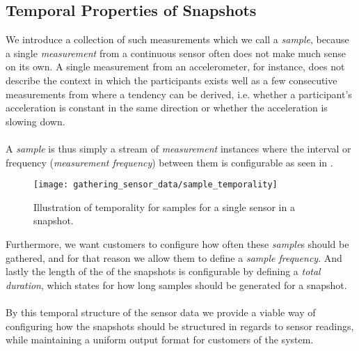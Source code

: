 
\subsection{Temporal Properties of Snapshots}
\label{sec:temporal_properties_of_snapshots}



We introduce a collection of such measurements which we call a \emph{sample}, because a single \emph{measurement} from a continuous sensor often does not make much sense on its own. A single measurement from an accelerometer, for instance, does not describe the context in which the participants exists well as a few consecutive measurements from where a tendency can be derived, i.e. whether a participant's acceleration is constant in the same direction or whether the acceleration is slowing down.
\\\\
A \emph{sample} is thus simply a stream of \emph{measurement} instances where the interval or frequency (\emph{measurement frequency}) between them is configurable as seen in .

\begin{figure}[!htbp]
    \centering
    \texttt{[image: gathering\_sensor\_data/sample\_temporality]}
    \caption{Illustration of temporality for samples for a single sensor in a snapshot.}
    \label{fig:sample_temporality}
\end{figure}
\FloatBarrier

Furthermore, we want customers to configure how often these \emph{sample}s should be gathered, and for that reason we allow them to define a \emph{sample frequency}. And lastly the length of the of the snapshots is configurable by defining a \emph{total duration}, which states for how long samples should be generated for a snapshot.
\\\\
By this temporal structure of the sensor data we provide a viable way of configuring how the snapshots should be structured in regards to sensor readings, while maintaining a uniform output format for customers of the system.
